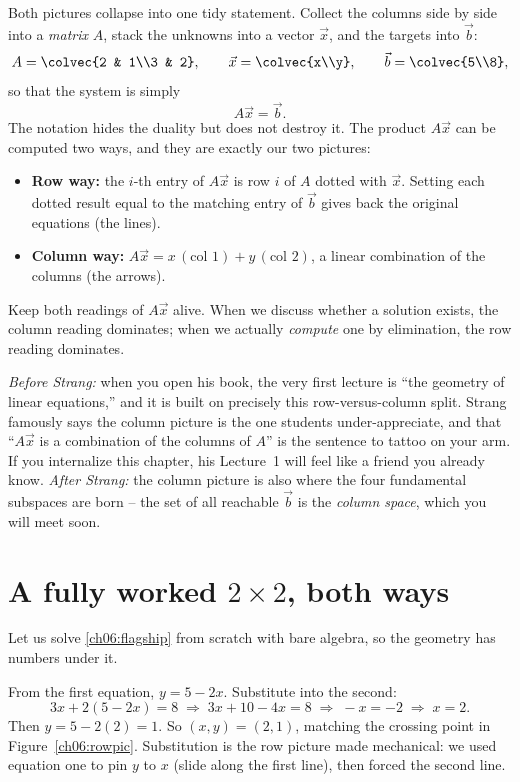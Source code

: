 Both pictures collapse into one tidy statement. Collect the columns
side by side into a \emph{matrix} $A$, stack the unknowns into a vector
$\vec x$, and the targets into $\vec b$:
\[
  A=\colvec{2 & 1\\3 & 2},\qquad
  \vec x=\colvec{x\\y},\qquad
  \vec b=\colvec{5\\8},
\]
so that the system is simply
\[
  A\vec x = \vec b.
\]
The notation hides the duality but does not destroy it. The product
$A\vec x$ can be computed two ways, and they are exactly our two pictures:
\begin{itemize}
  \item \textbf{Row way:} the $i$-th entry of $A\vec x$ is row $i$ of $A$
  dotted with $\vec x$. Setting each dotted result equal to the matching
  entry of $\vec b$ gives back the original equations (the lines).
  \item \textbf{Column way:} $A\vec x = x\,(\text{col }1) + y\,(\text{col
  }2)$, a linear combination of the columns (the arrows).
\end{itemize}
Keep both readings of $A\vec x$ alive. When we discuss whether a solution
exists, the column reading dominates; when we actually \emph{compute} one by
elimination, the row reading dominates.

\begin{strangbox}
\emph{Before Strang:} when you open his book, the very first lecture is
``the geometry of linear equations,'' and it is built on precisely this
row-versus-column split. Strang famously says the column picture is the one
students under-appreciate, and that ``$A\vec x$ is a combination of the
columns of $A$'' is the sentence to tattoo on your arm. If you internalize
this chapter, his Lecture~1 will feel like a friend you already know.
\emph{After Strang:} the column picture is also where the four fundamental
subspaces are born -- the set of all reachable $\vec b$ is the
\emph{column space}, which you will meet soon.
\end{strangbox}

\section{A fully worked $2\times 2$, both ways}

Let us solve \eqref{ch06:flagship} from scratch with bare algebra, so the
geometry has numbers under it.

\begin{example}
\label{ch06:ex-sub}
From the first equation, $y = 5 - 2x$. Substitute into the second:
\[
  3x + 2(5-2x) = 8 \;\Longrightarrow\; 3x + 10 - 4x = 8 \;\Longrightarrow\;
  -x = -2 \;\Longrightarrow\; x = 2.
\]
Then $y = 5 - 2(2) = 1$. So $(x,y)=(2,1)$, matching the crossing point in
Figure~\ref{ch06:rowpic}. Substitution is the row picture made mechanical:
we used equation one to pin $y$ to $x$ (slide along the first line), then
forced the second line.
\end{example}

